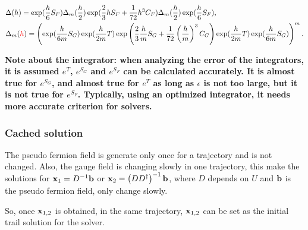 \begin{equation}
\begin{split}
&\Delta (h) =\exp (\frac{h}{6} S_F)\Delta _m (\frac{h}{2})\exp(\frac{2}{3}h S_F+\frac{1}{72}h^3 C_F)\Delta _m(\frac{h}{2}) \exp (\frac{h}{6} S_F),\\
&\Delta _m(\textcolor[rgb]{1,0,0}{h})=\left(\exp(\frac{h}{6 m} S_G)\exp(\frac{h}{2m}T)\exp\left(\frac{2}{3}\frac{h}{m} S_G+\frac{1}{72}\left(\frac{h}{m}\right)^3 C_G\right)\exp(\frac{h}{2m}T)\exp(\frac{h}{6m}S_G)\right)^m.\\
\end{split}
\end{equation}


\textbf{Note about the integrator: when analyzing the error of the integrators, it is assumed $e^T$, $e^{S_G}$ and $e^{S_F}$ can be calculated accurately. It is almost true for $e^{S_G}$, and almost true for $e^T$ as long as $\epsilon$ is not too large, but it is not true for $e^{S_F}$. Typically, using an optimized integrator, it needs more accurate criterion for solvers.}

\subsubsection{\label{sec:CachedSolution}Cached solution}

The pseudo fermion field is generate only once for a trajectory and is not changed. Also, the gauge field is changing slowly in one trajectory, this make the solutions for ${\bf x}_1=D^{-1}{\bf b}$ or ${\bf x}_2=\left(DD^{\dagger}\right)^{-1}{\bf b}$, where $D$ depends on $U$ and ${\bf b}$ is the pseudo fermion field, only change slowly.

So, once ${\bf x}_{1,2}$ is obtained, in the same trajectory, ${\bf x}_{1,2}$ can be set as the initial trail solution for the solver.

